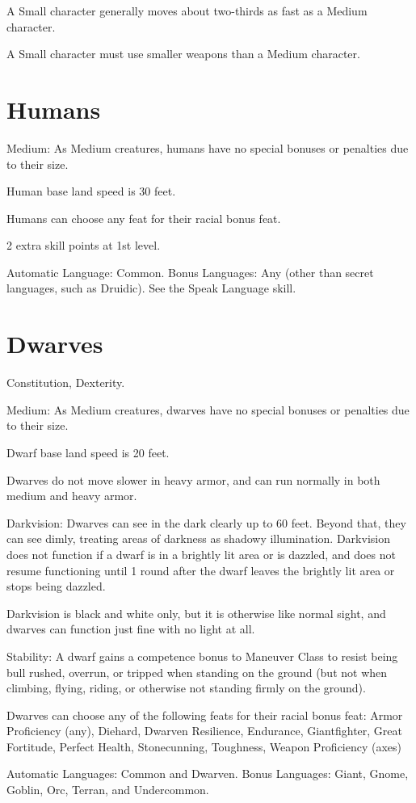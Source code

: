 A Small character generally moves about two-thirds as fast as a Medium character.

A Small character must use smaller weapons than a Medium character.

\section{Humans}
\begin{itemize*}
\item Medium: As Medium creatures, humans have no special bonuses or penalties due to their size.
\item Human base land speed is 30 feet.
\item Humans can choose any feat for their racial bonus feat.
 \item 2 extra skill points at 1st level.
\item Automatic Language: Common. Bonus Languages: Any (other than secret languages, such as Druidic). See the Speak Language skill.
\end{itemize*}

\section{Dwarves}
\begin{itemize*}
\item {} Constitution,  Dexterity.
\item Medium: As Medium creatures, dwarves have no special bonuses or penalties due to their size.
\item Dwarf base land speed is 20 feet.
\item Dwarves do not move slower in heavy armor, and can run normally in both medium and heavy armor.
\item Darkvision: Dwarves can see in the dark clearly up to 60 feet.   Beyond that, they can see dimly, treating areas of darkness as shadowy illumination. Darkvision does not function if a dwarf is in a brightly lit area or is dazzled, and does not resume functioning until 1 round after the dwarf leaves the brightly lit area or stops being dazzled.
\par Darkvision is black and white only, but it is otherwise like normal sight, and dwarves can function just fine with no light at all.
\item Stability: A dwarf gains a  competence bonus to Maneuver Class to resist being bull rushed, overrun, or tripped when standing on the ground (but not when climbing, flying, riding, or otherwise not standing firmly on the ground).
\item Dwarves can choose any of the following feats for their racial bonus feat: Armor Proficiency (any), Diehard, Dwarven Resilience, Endurance, Giantfighter, Great Fortitude, Perfect Health, Stonecunning, Toughness, Weapon Proficiency (axes)
\item Automatic Languages: Common and Dwarven. Bonus Languages: Giant, Gnome, Goblin, Orc, Terran, and Undercommon.
\end{itemize*}

